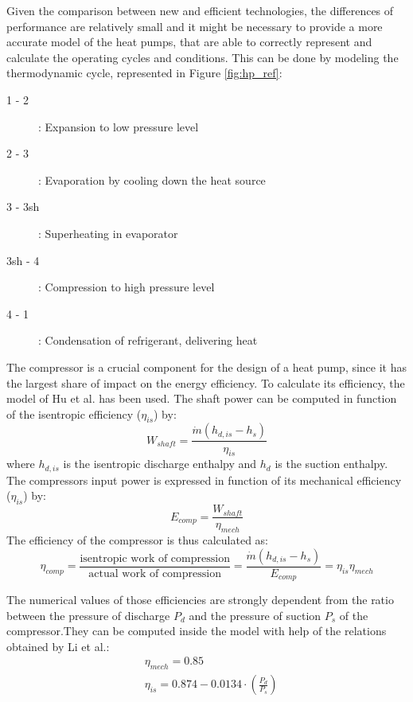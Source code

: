 \documentclass{article}
\begin{document}
Given the comparison between new and efficient technologies, the differences of performance are relatively small and it might be necessary to provide a more accurate model of the heat pumps, that are able to correctly represent and calculate the operating cycles and conditions. This can be done by modeling the thermodynamic cycle\cite{demierreModelingExperimentalInvestigation2014}, represented in Figure \ref{fig:hp_ref}:

\begin{description}
	\item [1 - 2]: Expansion to low pressure level
	\item [2 - 3]: Evaporation by cooling down the heat source
	\item [3 - 3sh]: Superheating in evaporator
	\item [3sh - 4]: Compression to high pressure level
	\item [4 - 1]: Condensation of refrigerant, delivering heat
\end{description}

The compressor is a crucial component for the design of a heat pump, since it has the largest share of impact on the energy efficiency. To calculate its efficiency, the model of Hu et al.\cite{huExtremumSeekingControl2015} has been used. The shaft power can be computed in function of the isentropic efficiency ($\eta_{is}$) by:
\begin{equation}
W_{shaft} = \frac{\dot{m}(h_{d,is}-h_{s})}{\eta_{is}} 
\end{equation}
where $h_{d,is}$ is the isentropic discharge enthalpy and $h_{d}$ is the suction enthalpy. The compressors input power is expressed in function of its mechanical efficiency ($\eta_{is}$) by:
\begin{equation}
E_{comp} = \frac{W_{shaft}}{\eta_{mech}}  
\end{equation}
The efficiency of the compressor is thus calculated as:
\begin{equation}
\eta_{comp} = \frac{\text{isentropic work of compression}}{\text{actual work of compression}} = \frac{\dot{m}(h_{d,is}-h_{s})}{E_{comp}} = \eta_{is}\eta_{mech} 
\end{equation}

The numerical values of those efficiencies are strongly dependent from the ratio between the pressure of discharge $P_{d}$ and the pressure of suction $P_{s}$ of the compressor.They can be computed inside the model with help of the relations obtained by Li et al.\cite{liPerformanceCharacteristicsR1234yf2014}:
\begin{align}
& \eta_{mech} = 0.85\\
& \eta_{is} = 0.874-0.0134\cdot(\frac{P_{d}}{P_{s}})\\
\end{align}
		
\end{document}
